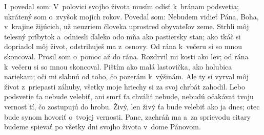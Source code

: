  I~povedal som: V~polovici svojho života
musím odísť k~bránam podsvetia;
\versseparator
ukrátený som o~zvyšok mojich rokov.
Povedal som: Nebudem vidieť Pána, Boha, v~krajine žijúcich,
\versseparator
už neuzriem človeka
uprostred obyvateľov zeme.
\versseparator
Strhli môj telesný príbytok a~odniesli ďaleko odo mňa
ako pastiersky stan;
\versseparator
ako tkáč si dopriadol môj život,
odstrihuješ ma z~osnovy.
Od rána k~večeru si so mnou skoncoval.
\versseparator
Prosil som o~pomoc až do rána.
Rozdrvil mi kosti ako lev;
\versseparator
od rána k~večeru si so mnou skoncoval.
Pištím ako malá lastovička,
ako holubica nariekam;
\versseparator
oči mi slabnú
od toho, čo pozerám k~výšinám.
\versseparator
Ale ty si vyrval môj život z~priepasti záhuby,
všetky moje hriechy si za svoj chrbát zahodil.
\versseparator
Lebo podsvetie ťa nebude velebiť,
ani smrť ťa chváliť nebude,
nebudú očakávať tvoju vernosť tí, čo zostupujú do hrobu.
\versseparator
Živý, len živý ťa bude velebiť ako ja dnes;
otec bude synom hovoriť o~tvojej vernosti.
\versseparator
Pane, zachráň ma
a~za sprievodu citary budeme spievať po všetky dni svojho života
v~dome Pánovom.
